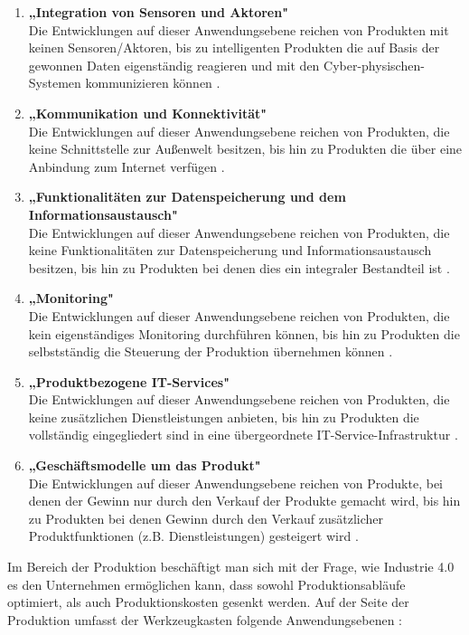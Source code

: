 \begin{enumerate}
	\item \textbf{„Integration von Sensoren und Aktoren"} \cite[S.13]{2} \\ Die Entwicklungen auf dieser Anwendungsebene reichen von Produkten mit keinen Sensoren/Aktoren, bis zu intelligenten Produkten die auf Basis der gewonnen Daten eigenständig reagieren und mit den Cyber-physischen-Systemen kommunizieren können \cite[S.13]{2}.
	\item \textbf{„Kommunikation und Konnektivität"} \cite[S.13]{2} \\ Die Entwicklungen auf dieser Anwendungsebene reichen von Produkten, die keine Schnittstelle zur Außenwelt besitzen, bis hin zu Produkten die über eine Anbindung zum Internet verfügen \cite[S.13]{2}.
	\item \textbf{„Funktionalitäten zur Datenspeicherung und dem Informationsaustausch"} \cite[S.13]{2} \\ Die Entwicklungen auf dieser Anwendungsebene reichen von Produkten, die keine Funktionalitäten zur Datenspeicherung und Informationsaustausch besitzen, bis hin zu Produkten bei denen dies ein integraler Bestandteil ist \cite[S.13]{2}.
	\item \textbf{„Monitoring"} \cite[S.13]{2} \\ Die Entwicklungen auf dieser Anwendungsebene reichen von Produkten, die kein eigenständiges Monitoring durchführen können, bis hin zu Produkten die selbstständig die Steuerung der Produktion übernehmen können \cite[S.13]{2}.
	\item \textbf{„Produktbezogene IT-Services"} \cite[S.13]{2} \\ Die Entwicklungen auf dieser Anwendungsebene reichen von Produkten, die keine zusätzlichen Dienstleistungen anbieten, bis hin zu Produkten die vollständig eingegliedert sind in eine übergeordnete IT-Service-Infrastruktur \cite[S.13]{2}.
	\item \textbf{„Geschäftsmodelle um das Produkt"} \cite[S.13]{2} \\ Die Entwicklungen auf dieser Anwendungsebene reichen von Produkte, bei denen der Gewinn nur durch den Verkauf der Produkte gemacht wird, bis hin zu Produkten bei denen Gewinn durch den Verkauf zusätzlicher Produktfunktionen (z.B. Dienstleistungen) gesteigert wird \cite[S.13]{2}.
\end{enumerate}
Im Bereich der Produktion beschäftigt man sich mit der Frage, wie Industrie 4.0 es den Unternehmen ermöglichen kann, dass sowohl Produktionsabläufe optimiert, als auch Produktionskosten gesenkt werden. Auf der Seite der Produktion umfasst der Werkzeugkasten folgende Anwendungsebenen \cite[S.15]{2}:
